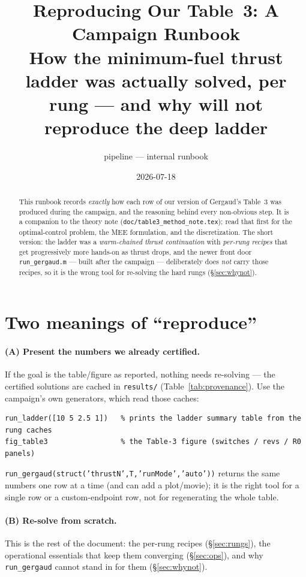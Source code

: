 \documentclass[11pt]{article}
\title{\vspace{-1.5em}Reproducing Our Table~3: A Campaign Runbook\\[3pt]
\large How the minimum-fuel thrust ladder was actually solved, per rung ---
and why \file{run\_gergaud} will not reproduce the deep ladder}
\author{\normalsize \file{earth\_elliptic\_to\_geo} pipeline --- internal runbook}
\date{\normalsize 2026-07-18}
\newcommand{\file}[1]{\texttt{\small #1}}
\begin{document}
\maketitle
\vspace{-1.4em}

\begin{abstract}
\noindent
This runbook records \emph{exactly} how each row of our version of Gergaud's
Table~3 was produced during the campaign, and the reasoning behind every
non-obvious step. It is a companion to the theory note
(\file{doc/table3\_method\_note.tex}); read that first for the optimal-control
problem, the MEE formulation, and the discretization. The short version: the
ladder was a \emph{warm-chained thrust continuation} with \emph{per-rung
recipes} that get progressively more hands-on as thrust drops, and the newer
front door \file{run\_gergaud.m} --- built after the campaign --- deliberately
does \emph{not} carry those recipes, so it is the wrong tool for re-solving the
hard rungs (\S\ref{sec:whynot}).
\end{abstract}

\section{Two meanings of ``reproduce''}

\paragraph{(A) Present the numbers we already certified.} If the goal is the
table/figure as reported, nothing needs re-solving --- the certified solutions
are cached in \file{results/} (Table~\ref{tab:provenance}). Use the campaign's
own generators, which read those caches:
\begin{lstlisting}
run_ladder([10 5 2.5 1])   % prints the ladder summary table from the rung caches
fig_table3                 % the Table-3 figure (switches / revs / R0 panels)
\end{lstlisting}
\file{run\_gergaud(struct('thrustN',T,'runMode','auto'))} returns the same
numbers one row at a time (and can add a plot/movie); it is the right tool for a
single row or a custom-endpoint row, not for regenerating the whole table.

\paragraph{(B) Re-solve from scratch.} This is the rest of the document: the
per-rung recipes (\S\ref{sec:rungs}), the operational essentials that keep them
converging (\S\ref{sec:ops}), and why \file{run\_gergaud} cannot stand in for
them (\S\ref{sec:whynot}).
\end{document}
